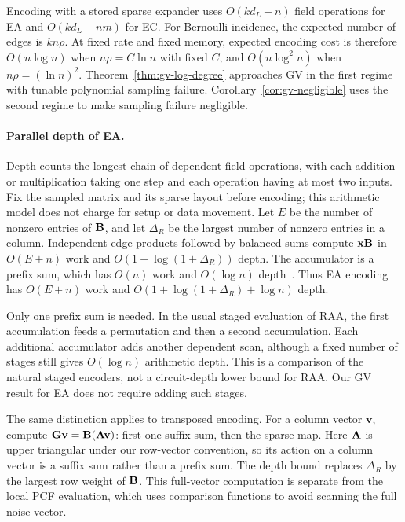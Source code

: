 Encoding with a stored sparse expander uses $O(kd_L+n)$ field operations for
EA and $O(kd_L+nm)$ for EC.  For Bernoulli incidence, the expected number of
edges is $kn\rho$.  At fixed rate and fixed memory, expected encoding cost is
therefore $O(n\log n)$ when $n\rho=C\ln n$ with fixed $C$, and
$O(n\log^2 n)$ when $n\rho=(\ln n)^2$.
Theorem~\ref{thm:gv-log-degree} approaches GV in the first regime with
tunable polynomial sampling failure.  Corollary~\ref{cor:gv-negligible}
uses the second regime to make sampling failure negligible.

\paragraph{Parallel depth of EA.}
\label{sec:ea-depth}
Depth counts the longest chain of dependent field operations, with each
addition or multiplication taking one step and each operation having at
most two inputs.  Fix the sampled matrix and its sparse layout before
encoding; this arithmetic model does not charge for setup or data movement.
Let $E$ be the number of nonzero entries of $\mathbf B$, and let $\Delta_R$ be
the largest number of nonzero entries in a column.
Independent edge products followed by balanced sums compute $\mathbf x\mathbf B$ in
$O(E+n)$ work and $O(1+\log(1+\Delta_R))$ depth.
The accumulator is a prefix sum, which has $O(n)$ work and $O(\log n)$
depth~\cite{BlellochTR90}.  Thus EA encoding has $O(E+n)$ work and
$O(1+\log(1+\Delta_R)+\log n)$ depth.

Only one prefix sum is needed.  In the usual staged evaluation of RAA,
the first accumulation feeds a permutation and then a second accumulation.
Each additional accumulator adds another dependent scan, although a fixed
number of stages still gives $O(\log n)$ arithmetic depth.
This is a comparison of the natural staged encoders, not a circuit-depth
lower bound for RAA.  Our GV result for EA does not require adding such stages.

The same distinction applies to transposed encoding.
For a column vector $\mathbf v$, compute
$\mathbf G\mathbf v=\mathbf B(\mathbf A\mathbf v)$: first one suffix sum, then the sparse map.
Here $\mathbf A$ is upper triangular under our row-vector convention, so its
action on a column vector is a suffix sum rather than a prefix sum.
The depth bound replaces $\Delta_R$ by the largest row weight of $\mathbf B$.
This full-vector computation is separate from the local PCF evaluation,
which uses comparison functions to avoid scanning the full noise vector.
